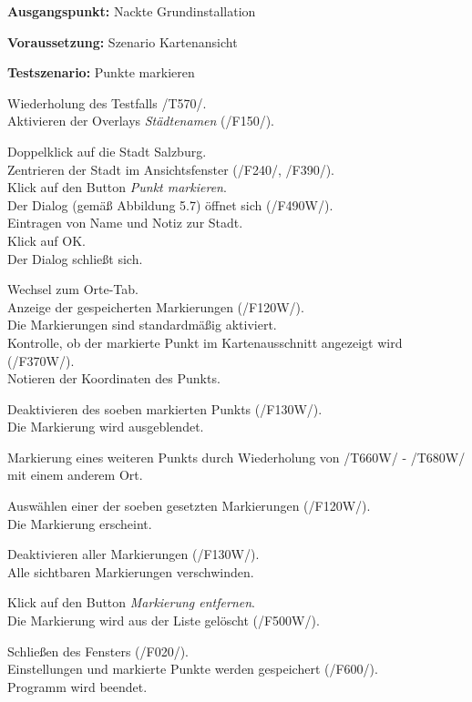 \documentclass[10pt]{scrreprt}
\newcommand{\sfbf}[1]{\textbf{\sffamily #1}}
\newcommand{\ziel}[1]{{\fontsize{9.5}{11}\textsf{/#1/}}}
\newcommand{\ziellabel}{Z}
\newcommand{\wunsch}{\renewcommand{\labelenumi}{\textbf{\ziel{\ziellabel\numprint{\theenumi}0W}}}}
\newenvironment{details}[1][6pt]{%
  \parskip#1 \parindent6mm \raggedright%
  \def\item{\par\ignorespaces\hangindent=5mm \hangafter1}}{%
  \par\ignorespaces}
\begin{document}
\newpage
\vspace{1.0cm}
\begin{details}[2pt]
\item \sfbf{Ausgangspunkt:} Nackte Grundinstallation 
\item \sfbf{Voraussetzung:} Szenario Kartenansicht
\item \sfbf{Testszenario:} Punkte markieren
\end{details}
\vspace{2mm}
\begin{enumerate}[leftmargin = 2.2cm, resume]
\wunsch
\item Wiederholung des Testfalls \ziel{T570}.\\Aktivieren der Overlays \textit{Städtenamen} (\ziel{F150}).
\item Doppelklick auf die Stadt Salzburg.\\Zentrieren der Stadt im Ansichtsfenster (\ziel{F240}, \ziel{F390}).\\Klick auf den Button \textit{Punkt markieren}.\\Der Dialog (gemäß Abbildung 5.7) öffnet sich (\ziel{F490W}).\\Eintragen von Name und Notiz zur Stadt.\\Klick auf OK.\\Der Dialog schließt sich.
\item Wechsel zum Orte-Tab.\\Anzeige der gespeicherten Markierungen (\ziel{F120W}).\\Die Markierungen sind standardmäßig aktiviert.\\Kontrolle, ob der markierte Punkt im Kartenausschnitt angezeigt wird (\ziel{F370W}).\\Notieren der Koordinaten des Punkts.
\item Deaktivieren des soeben markierten Punkts (\ziel{F130W}). \\Die Markierung wird ausgeblendet.
\item Markierung eines weiteren Punkts durch Wiederholung von \ziel{T660W} - \ziel{T680W} mit einem anderem Ort.
\item Auswählen einer der soeben gesetzten Markierungen (\ziel{F120W}).\\Die Markierung erscheint.
\item Deaktivieren aller Markierungen (\ziel{F130W}).\\Alle sichtbaren Markierungen verschwinden.
\item Klick auf den Button \textit{Markierung entfernen}.\\Die Markierung wird aus der Liste gelöscht (\ziel{F500W}).
\item Schließen des Fensters (\ziel{F020}).\\Einstellungen und markierte Punkte werden gespeichert (\ziel{F600}).\\Programm wird beendet.
\end{enumerate}
\end{document}
